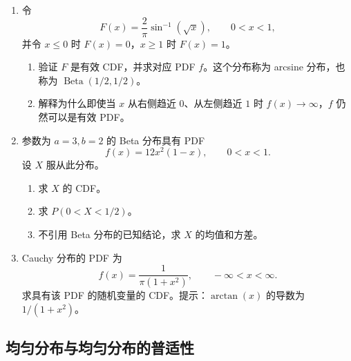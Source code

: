 \documentclass[UTF8, 12pt, fontset=fandol, oneside]{ctexart}
\begin{document}
\begin{enumerate}
  \item 令
  \[
    F(x)=\frac{2}{\pi}\sin^{-1}(\sqrt{x}),\qquad 0<x<1,
  \]
  并令 $x\le0$ 时 $F(x)=0$，$x\ge1$ 时 $F(x)=1$。
  \begin{enumerate}
    \item 验证 $F$ 是有效 CDF，并求对应 PDF $f$。这个分布称为 arcsine 分布，也称为 $\operatorname{Beta}(1/2,1/2)$。
    \item 解释为什么即使当 $x$ 从右侧趋近 $0$、从左侧趋近 $1$ 时 $f(x)\to\infty$，$f$ 仍然可以是有效 PDF。
  \end{enumerate}

  \item 参数为 $a=3,b=2$ 的 Beta 分布具有 PDF
  \[
    f(x)=12x^2(1-x),\qquad 0<x<1.
  \]
  设 $X$ 服从此分布。
  \begin{enumerate}
    \item 求 $X$ 的 CDF。
    \item 求 $P(0<X<1/2)$。
    \item 不引用 Beta 分布的已知结论，求 $X$ 的均值和方差。
  \end{enumerate}

  \item Cauchy 分布的 PDF 为
  \[
    f(x)=\frac{1}{\pi(1+x^2)},\qquad -\infty<x<\infty.
  \]
  求具有该 PDF 的随机变量的 CDF。提示：$\arctan(x)$ 的导数为 $1/(1+x^2)$。
\end{enumerate}

\subsection*{均匀分布与均匀分布的普适性}
\end{document}
